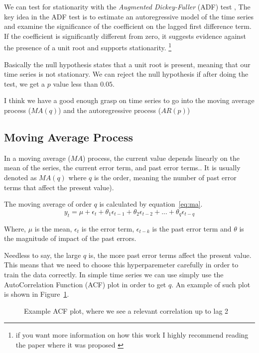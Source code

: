 \documentclass[journal]{IEEEtran}
\begin{document}
We can test for stationarity with the \emph{Augmented Dickey-Fuller} (ADF) test
\cite{adf}, The key idea in the ADF test is to estimate an autoregressive model
of the time series and examine the significance of the coefficient on the
lagged first difference term. If the coefficient is significantly different
from zero, it suggests evidence against the presence of a unit root and
supports stationarity. \footnote{if you want more information on how this work
I highly recommend reading the paper where it was proposed \cite{adf}}

Basically the null hypothesis states that a unit root is present, meaning that
our time series is not stationary. We can reject the null hypothesis if after
doing the test, we get a $p$ value less than $0.05$.

I think we have a good enough grasp on time series to go into the moving
average process ($MA(q)$) and the autoregressive process ($AR(p)$)

\subsection{Moving Average Process}\label{sub:ma}

In a moving average ($MA$) process, the current value depends linearly on the
mean of the series, the current error term, and past error
terms.\cite{timeseries}. It is usually denoted as $MA(q)$ where $q$ is the
order, meaning the number of past error terms that affect the present value).

The moving average of order $q$ is calculated by equation~\ref{eq:ma}.
\begin{equation}
    y_t = \mu + \epsilon_t + \theta_1\epsilon_{t-1} + \theta_2\epsilon_{t-2} +
            ... +  \theta_q\epsilon_{t-q}
    \label{eq:ma}
\end{equation}

Where, $\mu$ is the mean, $\epsilon_t$ is the error term, $\epsilon_{t-k}$ is
the past error term and $\theta$ is the magnitude of impact of the past errors.

Needless to say, the large $q$ is, the more past error terms affect the
present value. This means that we need to choose this hyperparemeter carefully
in order to train the data correctly. In simple time series we can use simply
use the AutoCorrelation Function (ACF) plot in  order to get $q$. An example
of such plot is shown in Figure~\ref{fig:acf}.

\begin{figure}[htbp]
  \centering
  
    \caption{Example ACF plot, where we see a relevant correlation up to lag 2}
  \label{fig:acf}
\end{figure}
\end{document}
